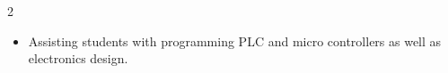 \documentclass[10pt,a4paper,ragged2e,withhyper]{altacv}
\begin{document}
\begin{paracol}{2}
\divider


\begin{itemize}
    \item Assisting students with programming PLC and micro controllers as well as electronics design.
\end{itemize}

\divider







\switchcolumn


\end{paracol}
\end{document}
